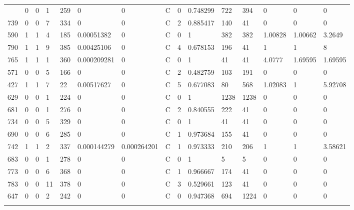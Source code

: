 \begin{latin}
\begin{longtable}{lllllllllllllll}
\begin{comment}
	664 & 0  & 0   & 1  & 259 & 0              & 0              & C & 0  & 0.748299 & 722  & 394  & 0       & 0       & 0       \\
	739 & 0  & 0   & 7  & 334 & 0              & 0              & C & 2  & 0.885417 & 140  & 41   & 0       & 0       & 0       \\
	590 & 1  & 1   & 4  & 185 & 0.00051382     & 0              & C & 0  & 1        & 382  & 382  & 1.00828 & 1.00662 & 3.2649  \\
	790 & 1  & 1   & 9  & 385 & 0.00425106     & 0              & C & 4  & 0.678153 & 196  & 41   & 1       & 1       & 8       \\
	765 & 1  & 1   & 1  & 360 & 0.000209281    & 0              & C & 0  & 1        & 41   & 41   & 4.0777  & 1.69595 & 1.69595 \\
	571 & 0  & 0   & 5  & 166 & 0              & 0              & C & 2  & 0.482759 & 103  & 191  & 0       & 0       & 0       \\
	427 & 1  & 1   & 7  & 22  & 0.00517627     & 0              & C & 5  & 0.677083 & 80   & 568  & 1.02083 & 1       & 5.92708 \\
	629 & 0  & 0   & 1  & 224 & 0              & 0              & C & 0  & 1        & 1238 & 1238 & 0       & 0       & 0       \\
	681 & 0  & 0   & 1  & 276 & 0              & 0              & C & 2  & 0.840555 & 222  & 41   & 0       & 0       & 0       \\
	734 & 0  & 0   & 5  & 329 & 0              & 0              & C & 0  & 1        & 41   & 41   & 0       & 0       & 0       \\
	690 & 0  & 0   & 6  & 285 & 0              & 0              & C & 1  & 0.973684 & 155  & 41   & 0       & 0       & 0       \\
	742 & 1  & 1   & 2  & 337 & 0.000144279    & 0.000264201    & C & 1  & 0.973333 & 210  & 206  & 1       & 1       & 3.58621 \\
	683 & 0  & 0   & 1  & 278 & 0              & 0              & C & 0  & 1        & 5    & 5    & 0       & 0       & 0       \\
	773 & 0  & 0   & 6  & 368 & 0              & 0              & C & 1  & 0.966667 & 174  & 41   & 0       & 0       & 0       \\
	783 & 0  & 0   & 11 & 378 & 0              & 0              & C & 3  & 0.529661 & 123  & 41   & 0       & 0       & 0       \\
	647 & 0  & 0   & 2  & 242 & 0              & 0              & C & 0  & 0.947368 & 694  & 1224 & 0       & 0       & 0       \\

\end{comment}
\end{longtable}
\end{latin}
